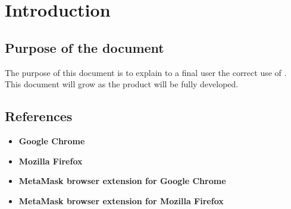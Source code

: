 \documentclass[ManualeUtente]{subfiles}
\begin{document}
\chapter{Introduction}

	\section{Purpose of the document}
	The purpose of this document is to explain to a final user the correct use of \progetto.
	This document will grow as the product will be fully developed.
	
	\scopoProdottoEN
	
	
	\section{References}
		\begin{itemize}
			\item \textbf{Google Chrome}\\
			\item \textbf{Mozilla Firefox}\\
			\item \textbf{MetaMask browser extension for Google Chrome}\\
			\item \textbf{MetaMask browser extension for Mozilla Firefox}\\
		\end{itemize}
\end{document}
